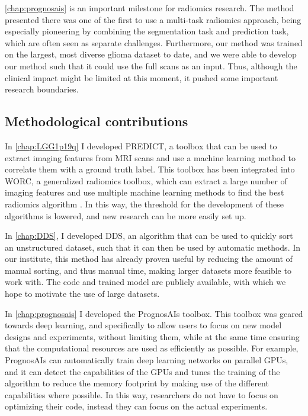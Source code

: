 \cref{chap:prognosais} is an important milestone for radiomics research.
The method presented there was one of the first to use a multi-task radiomics approach, being especially pioneering by combining the segmentation task and prediction task, which are often seen as separate challenges.
Furthermore, our method was trained on the largest, most diverse glioma dataset to date, and we were able to develop our method such that it could use the full scans as an input.
Thus, although the clinical impact might be limited at this moment, it pushed some important research boundaries.


\subsection{Methodological contributions}
In \cref{chap:LGG1p19q} I developed PREDICT, a toolbox that can be used to extract imaging features from \gls{MRI} scans and use a machine learning method to correlate them with a ground truth label.
This toolbox has been integrated into WORC, a generalized radiomics toolbox, which can extract a large number of imaging features and use multiple machine learning methods to find the best radiomics algorithm \autocite{mstarmans2020worc}.
In this way, the threshold for the development of these algorithms is lowered, and new research can be more easily set up.

In \cref{chap:DDS}, I developed \gls{DDS}, an algorithm that can be used to quickly sort an unstructured dataset, such that it can then be used by automatic methods.
In our institute, this method has already proven useful by reducing the amount of manual sorting, and thus manual time, making larger datasets more feasible to work with.
The code and trained model are publicly available, with which we hope to motivate the use of large datasets.

In \cref{chap:prognosais} I developed the PrognosAIs toolbox.
This toolbox was geared towards deep learning, and specifically to allow users to focus on new model designs and experiments, without limiting them, while at the same time ensuring that the computational resources are used as efficiently as possible.
For example, PrognosAIs can automatically train deep learning networks on parallel GPUs, and it can detect the capabilities of the GPUs and tunes the training of the algorithm to reduce the memory footprint by making use of the different capabilities where possible.
In this way, researchers do not have to focus on optimizing their code, instead they can focus on the actual experiments.




